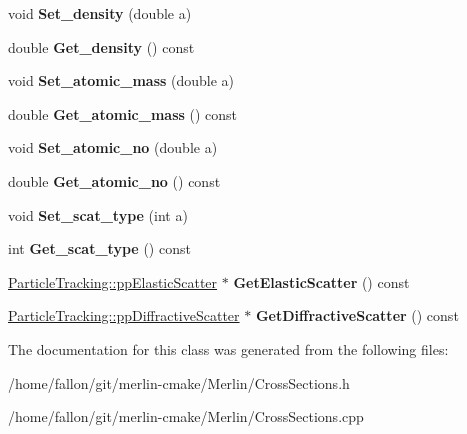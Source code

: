 \begin{DoxyCompactItemize}
void {\bfseries Set\+\_\+density} (double a)
\item 
\mbox{\label{classCollimation_1_1CrossSections_a969aa7158af5b0354f9a1987570943a2}} 
double {\bfseries Get\+\_\+density} () const
\item 
\mbox{\label{classCollimation_1_1CrossSections_a1c38d17e2370ebc7267ae6fbd79c7091}} 
void {\bfseries Set\+\_\+atomic\+\_\+mass} (double a)
\item 
\mbox{\label{classCollimation_1_1CrossSections_aed072de15db2d4392c27e432aedecbe2}} 
double {\bfseries Get\+\_\+atomic\+\_\+mass} () const
\item 
\mbox{\label{classCollimation_1_1CrossSections_abb26a8ab7513e1111fb57cdb818a8b03}} 
void {\bfseries Set\+\_\+atomic\+\_\+no} (double a)
\item 
\mbox{\label{classCollimation_1_1CrossSections_a32823016d314982b8ec9855140369f2e}} 
double {\bfseries Get\+\_\+atomic\+\_\+no} () const
\item 
\mbox{\label{classCollimation_1_1CrossSections_a1b287c237264fe218afeb6b710f351f7}} 
void {\bfseries Set\+\_\+scat\+\_\+type} (int a)
\item 
\mbox{\label{classCollimation_1_1CrossSections_abec4558086c5b943c293f09a8eae6cb0}} 
int {\bfseries Get\+\_\+scat\+\_\+type} () const
\item 
\mbox{\label{classCollimation_1_1CrossSections_a86b9cc61058db4490c9b4d08b8988475}} 
\hyperlink{classParticleTracking_1_1ppElasticScatter}{Particle\+Tracking\+::pp\+Elastic\+Scatter} $\ast$ {\bfseries Get\+Elastic\+Scatter} () const
\item 
\mbox{\label{classCollimation_1_1CrossSections_a9e9fa09cd12cb1df1675ead3f9b6cd1b}} 
\hyperlink{classParticleTracking_1_1ppDiffractiveScatter}{Particle\+Tracking\+::pp\+Diffractive\+Scatter} $\ast$ {\bfseries Get\+Diffractive\+Scatter} () const
\end{DoxyCompactItemize}


The documentation for this class was generated from the following files\+:\begin{DoxyCompactItemize}
\item 
/home/fallon/git/merlin-\/cmake/\+Merlin/Cross\+Sections.\+h\item 
/home/fallon/git/merlin-\/cmake/\+Merlin/Cross\+Sections.\+cpp\end{DoxyCompactItemize}
